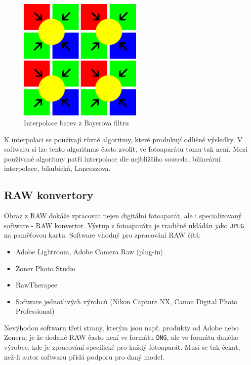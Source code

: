 \documentclass[12pt,a4paper,titlepage,final]{report}
\begin{document}
\begin{figure}[ht]
\begin{center}
\includegraphics[width=6cm]{images/bayer-interpolation.pdf}
\caption{Interpolace barev z Bayerova filtru}
\label{fig:bayer-inter}
\end{center}
\end{figure}

K interpolaci se používají různé algoritmy, které produkují odlišné výsledky. V softwaru si lze tento algoritmus často zvolit, ve fotoaparátu tomu tak není. Mezi používané algoritmy patří interpolace dle nejbližšího souseda, bilineární interpolace, bikubická, Lancoszova.

\subsection{RAW konvertory}

Obraz z RAW dokáže zpracovat nejen digitální fotoaparát, ale i specializovaný software - RAW konvertor. Výstup z fotoaparátu je tradičně ukládán jako \verb|JPEG| na paměťovou kartu. Software vhodný pro zpracování RAW čítá:

\begin{itemize}
	\item Adobe Lightroom, Adobe Camera Raw (plug-in)
	\item Zoner Photo Studio
	\item RawTherapee
	\item Software jednotlivých výrobců (Nikon Capture NX, Canon Digital Photo Professional)
\end{itemize}

Nevýhodou softwaru třetí strany, kterým jsou např. produkty od Adobe nebo Zoneru, je že dodané RAW často není ve formátu \verb|DNG|, ale ve formátu daného výrobce, kde je zpracování specifické pro každý fotoaparát. Musí se tak čekat, než-li autor softwaru přidá podporu pro daný model.
\end{document}
